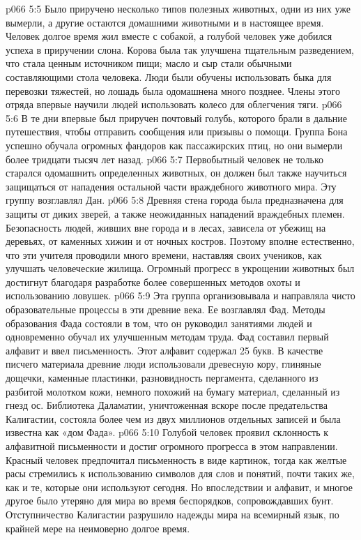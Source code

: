 \vs p066 5:5 Было приручено несколько типов полезных животных, одни из них уже вымерли, а другие остаются домашними животными и в настоящее время. Человек долгое время жил вместе с собакой, а голубой человек уже добился успеха в приручении слона. Корова была так улучшена тщательным разведением, что стала ценным источником пищи; масло и сыр стали обычными составляющими стола человека. Люди были обучены использовать быка для перевозки тяжестей, но лошадь была одомашнена много позднее. Члены этого отряда впервые научили людей использовать колесо для облегчения тяги.
\vs p066 5:6 В те дни впервые был приручен почтовый голубь, которого брали в дальние путешествия, чтобы отправить сообщения или призывы о помощи. Группа Бона успешно обучала огромных фандоров как пассажирских птиц, но они вымерли более тридцати тысяч лет назад.
\vs p066 5:7 \pc {}\bibnobreakspace {} Первобытный человек не только старался одомашнить определенных животных, он должен был также научиться защищаться от нападения остальной части враждебного животного мира. Эту группу возглавлял Дан.
\vs p066 5:8 Древняя стена города была предназначена для защиты от диких зверей, а также неожиданных нападений враждебных племен. Безопасность людей, живших вне города и в лесах, зависела от убежищ на деревьях, от каменных хижин и от ночных костров. Поэтому вполне естественно, что эти учителя проводили много времени, наставляя своих учеников, как улучшать человеческие жилища. Огромный прогресс в укрощении животных был достигнут благодаря разработке более совершенных методов охоты и использованию ловушек.
\vs p066 5:9 \pc {}\bibnobreakspace {} Эта группа организовывала и направляла чисто образовательные процессы в эти древние века. Ее возглавлял Фад. Методы образования Фада состояли в том, что он руководил занятиями людей и одновременно обучал их улучшенным методам труда. Фад составил первый алфавит и ввел письменность. Этот алфавит содержал 25 букв. В качестве писчего материала древние люди использовали древесную кору, глиняные дощечки, каменные пластинки, разновидность пергамента, сделанного из разбитой молотком кожи, немного похожий на бумагу материал, сделанный из гнезд ос. Библиотека Даламатии, уничтоженная вскоре после предательства Калигастии, состояла более чем из двух миллионов отдельных записей и была известна как «дом Фада».
\vs p066 5:10 Голубой человек проявил склонность к алфавитной письменности и достиг огромного прогресса в этом направлении. Красный человек предпочитал письменность в виде картинок, тогда как желтые расы стремились к использованию символов для слов и понятий, почти таких же, как и те, которые они используют сегодня. Но впоследствии и алфавит, и многое другое было утеряно для мира во время беспорядков, сопровождавших бунт. Отступничество Калигастии разрушило надежды мира на всемирный язык, по крайней мере на неимоверно долгое время.
